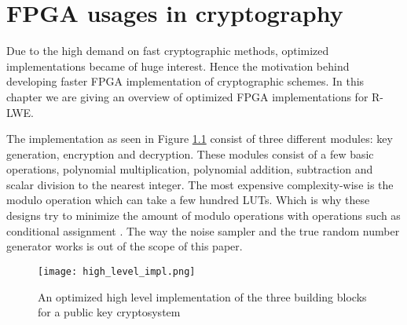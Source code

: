 \chapter{FPGA usages in cryptography\label{FPGA_crypto}}
Due to the high demand on fast cryptographic methods, optimized implementations
became of huge interest. Hence the motivation behind developing faster FPGA
implementation of cryptographic schemes. In this chapter we are giving an
overview of optimized FPGA implementations for R-LWE.


The implementation as seen in Figure \ref{fig:high_level_pkc_impl} consist of
three different modules: key generation, encryption and decryption. These
modules consist of a few basic operations, polynomial multiplication,
polynomial addition, subtraction and scalar division to the nearest integer.
The most expensive complexity-wise is the modulo operation which can take a few
hundred LUTs. Which is why these designs try to minimize the amount of modulo
operations with operations such as conditional assignment
\citep{FPGA_Post_Quantum_Primitives}. The way the noise sampler and the true
random number generator works is out of the scope of this paper.

\begin{figure}[H]
    \centering
    \texttt{[image: high\_level\_impl.png]}
    \caption{An optimized high level implementation of the three building
    blocks for a public key cryptosystem \citep{FPGA_Post_Quantum_Primitives}}
    \label{fig:high_level_pkc_impl}

\end{figure}

